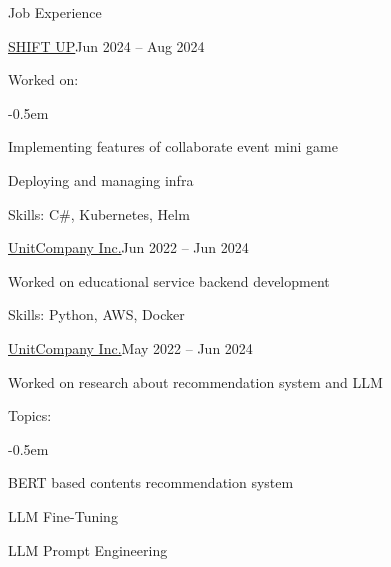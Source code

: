 \documentclass{resume}
\begin{document}
\begin{rSection}{Job Experience}
    \begin{rSubsection}{\href{https://shiftup.co.kr/}{SHIFT UP}}{Jun 2024 -- Aug 2024}
        {\bfseries{}}

        \item Worked on:

        \vspace{-0.5em}
        \begin{list}{--}{}
            \itemsep -0.5em

            \item Implementing features of collaborate event mini game

            \item Deploying and managing infra
        \end{list}

        \item Skills: C\#, Kubernetes, Helm
    \end{rSubsection}

    \begin{rSubsection}{\href{https://unitcompany.co.kr}{UnitCompany Inc.}}{Jun 2022 -- Jun 2024}
        {\bfseries{}}

        \item Worked on educational service backend development

        \item Skills: Python, AWS, Docker
    \end{rSubsection}

    \begin{rSubsection}{\href{https://unitcompany.co.kr}{UnitCompany Inc.}}{May 2022 -- Jun 2024}
        {\bfseries{}}

        \item Worked on research about recommendation system and LLM

        \item Topics:

        \vspace{-0.5em}
        \begin{list}{--}{}
            \itemsep -0.5em

            \item BERT based contents recommendation system

            \item LLM Fine-Tuning

            \item LLM Prompt Engineering
        \end{list}
    \end{rSubsection}
\end{rSection}
\end{document}
